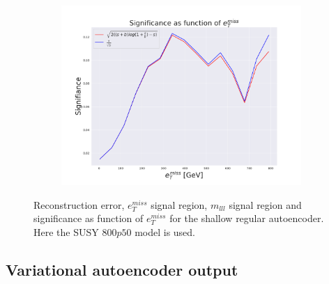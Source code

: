\begin{figure}[H]
    \hfill  
    \begin{subfigure}{.40\textwidth}
        \includegraphics[width=\textwidth]{Figures/AE_testing/small/2lep/significance_etmiss_800p0p050_-0.805852780573614.pdf}
        \caption{}
        \label{fig:AE_2lep_small_signi_800_3}
    \end{subfigure}
    \hfill      
    \caption[2lep shallow network | $800p50$ | AE | 3]{Reconstruction error, $e_T^{miss}$ signal region, $m_{lll}$ signal region and significance as function of 
    $e_T^{miss}$ for the shallow regular autoencoder. Here the SUSY $800p50$ model is used.}
    \label{fig:AE_2lep_small_rec_sig_signi_800_3}
\end{figure}















\subsection*{Variational autoencoder output}












